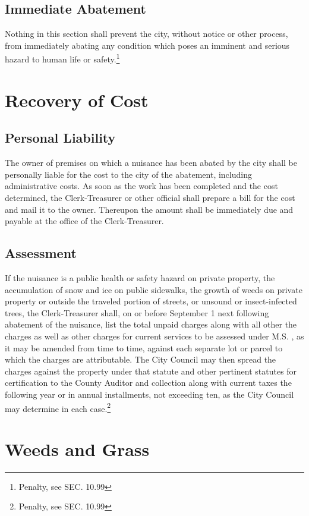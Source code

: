 \subsection{Immediate Abatement}
Nothing in this section shall prevent the city, without notice or other process, from immediately abating any condition which poses an imminent and serious hazard to human life or safety.\footnote{Penalty, see SEC. 10.99}
\section{Recovery of Cost}
\subsection{Personal Liability}
The owner of premises on which a nuisance has been abated by the city shall be personally liable for the cost to the city of the abatement, including administrative costs.  As soon as the work has been completed and the cost determined, the Clerk-Treasurer or other official shall prepare a bill for the cost and mail it to the owner.  Thereupon the amount shall be immediately due and payable at the office of the Clerk-Treasurer.
\subsection{Assessment}
If the nuisance is a public health or safety hazard on private property, the accumulation of snow and ice on public sidewalks, the growth of weeds on private property or outside the traveled portion of streets, or unsound or insect-infected trees, the Clerk-Treasurer shall, on or before September 1 next following abatement of the nuisance, list the total unpaid charges along with all other the charges as well as other charges for current services to be assessed under M.S. , as it may be amended from time to time, against each separate lot or parcel to which the charges are attributable.  The City Council may then spread the charges against the property under that statute and other pertinent statutes for certification to the County Auditor and collection along with current taxes the following year or in annual installments, not exceeding ten, as the City Council may determine in each case.\footnote{Penalty, see SEC. 10.99}\\


\setcounter{section}{34}
\section{Weeds and Grass}
